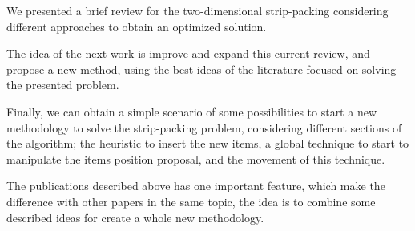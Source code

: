 We presented  a brief review for the two-dimensional strip-packing
considering different approaches to obtain an optimized solution.

The idea of the next work is improve and expand this current review,
and propose a new method, using the best ideas of the literature
focused on solving the presented problem.

Finally,
we can obtain a simple scenario
of some possibilities to start a new methodology
to solve the strip-packing problem,
considering different sections of the algorithm;
the heuristic to insert the new items,
a global technique to start to manipulate the items
position proposal, and the movement of this technique.

The publications described above
has one important feature, which make the difference
with other papers in the same topic,
the idea is to combine some described ideas for create a whole
new methodology.

